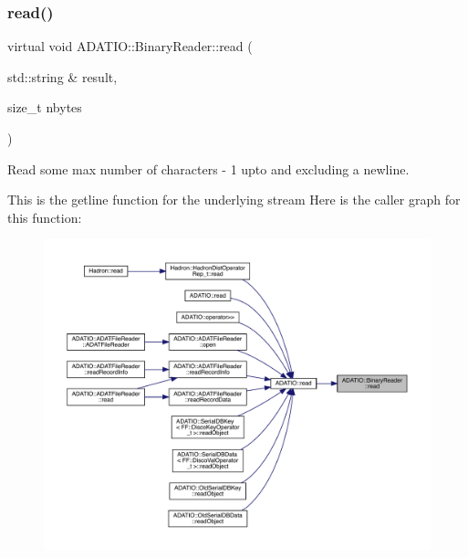 \mbox{\label{classADATIO_1_1BinaryReader_a4d79cabea18fccc818eaf2c45ed21b1f}} 
\subsubsection{\texorpdfstring{read()}{read()}\hspace{0.1cm}{\footnotesize\ttfamily [1/22]}}
{\footnotesize\ttfamily virtual void A\+D\+A\+T\+I\+O\+::\+Binary\+Reader\+::read (\begin{DoxyParamCaption}\item[{std\+::string \&}]{result,  }\item[{size\+\_\+t}]{nbytes }\end{DoxyParamCaption})\hspace{0.3cm}{\ttfamily [virtual]}}



Read some max number of characters -\/ 1 upto and excluding a newline. 

This is the getline function for the underlying stream Here is the caller graph for this function\+:\nopagebreak
\begin{figure}[H]
\begin{center}
\leavevmode
\includegraphics[width=350pt]{da/dd9/classADATIO_1_1BinaryReader_a4d79cabea18fccc818eaf2c45ed21b1f_icgraph}
\end{center}
\end{figure}
\mbox{\label{classADATIO_1_1BinaryReader_a4d79cabea18fccc818eaf2c45ed21b1f}} 
